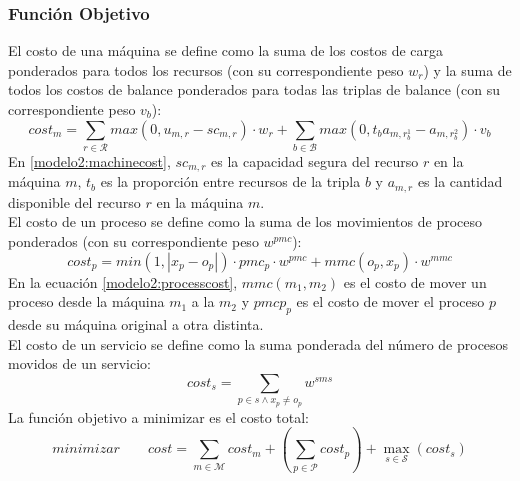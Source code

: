 \subsubsection{Función Objetivo}
El costo de una máquina se define como la suma de los costos de carga ponderados para todos los recursos (con su correspondiente peso $w_r$) y la suma de todos los costos de balance ponderados  para todas las triplas de balance (con su correspondiente peso $v_b$):
\begin{equation}\label{modelo2:machinecost}
	cost_m = \sum_{r \in \mathcal{R}}max(0,u_{m,r}-sc_{m,r})\cdot w_r + \sum_{b \in \mathcal{B}}max(0,t_ba_{m,r_{b}^1} - a_{m,r_{b}^2})\cdot v_b
\end{equation}
En \eqref{modelo2:machinecost}, $sc_{m,r}$ es la capacidad segura del recurso $r$ en la máquina $m$, $t_b$ es la proporción entre recursos de la tripla $b$ y $a_{m,r}$ es la cantidad disponible del recurso $r$ en la máquina $m$. \\
El costo de un proceso se define como la suma de los movimientos de proceso ponderados (con su correspondiente peso $w^{pmc}$):
\begin{equation}\label{modelo2:processcost}
	cost_p = min(1,|x_p - o_p|)\cdot pmc_p\cdot w^{pmc} + mmc(o_p,x_p)\cdot w^{mmc}
\end{equation}
En la ecuación \eqref{modelo2:processcost}, $mmc(m_1,m_2)$ es el costo de mover un proceso desde la máquina $m_1$ a la $m_2$ y $pmcp_p$ es el costo de mover el proceso $p$ desde su máquina original a otra distinta.\\
El costo de un servicio se define como la suma ponderada del número de procesos movidos de un servicio:
\begin{equation}\label{modelo2:servicecost}
	cost_s = \sum_{p \in s \wedge x_p \neq o_p}w^{sms}
\end{equation}
La función objetivo a minimizar es el costo total:
\begin{equation}\label{modelo2:overallcost}
	minimizar \qquad cost = \sum_{m \in \mathcal{M}}cost_m + (\sum_{p \in \mathcal{P}}cost_p) + \max\limits_{s \in \mathcal{S}}(cost_s)
\end{equation}

